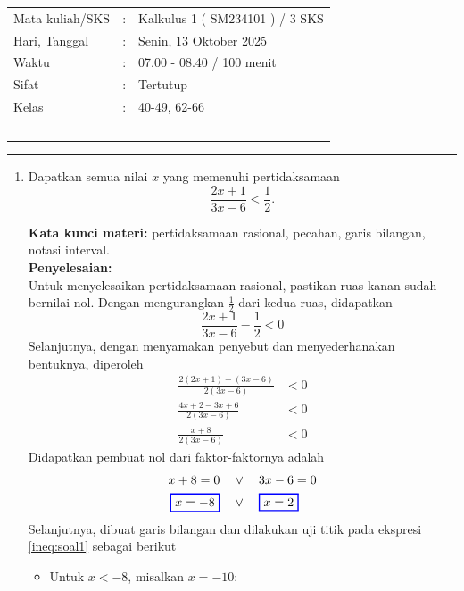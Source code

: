 \documentclass[10pt,openany,a4paper]{article}
\theoremstyle{definition}
\theoremstyle{definition}
\theoremstyle{plain}
\newenvironment{jawab}[2][tes]{%
\par\noindent\textbf{Kata kunci materi:} #1.\\
\textbf{Penyelesaian:} #2%
}{}
\begin{document}
    \begin{center}
	\begin{tabular}{lcl}
		Mata kuliah/SKS & : & Kalkulus 1 ( SM234101 ) / 3 SKS\\
		Hari, Tanggal & : & Senin, 13 Oktober 2025\\
		Waktu & : & 07.00 - 08.40 / 100 menit\\
		Sifat & : & Tertutup\\
		Kelas & : & 40-49, 62-66\\
  ~
	\end{tabular}

    \noindent\rule{\textwidth}{2.pt}
        \end{center}
    \begin{enumerate}
     \item Dapatkan semua nilai \(x\) yang memenuhi pertidaksamaan
    \[
        \dfrac{2x + 1}{3x - 6} < \dfrac{1}{2}.
    \]
\begin{jawab}[pertidaksamaan rasional, pecahan, garis bilangan, notasi interval]{~\\
        Untuk menyelesaikan pertidaksamaan rasional, pastikan ruas kanan sudah bernilai nol. Dengan mengurangkan \(\frac{1}{2}\) dari kedua ruas, didapatkan
        \[
        \frac{2x + 1}{3x - 6} - \frac{1}{2} < 0
        \]
        Selanjutnya, dengan menyamakan penyebut dan menyederhanakan bentuknya, diperoleh
        \begin{align}
            \frac{2(2x+1)-(3x-6)}{2(3x-6)} &< 0\nonumber\\
             \frac{4x + 2 - 3x + 6}{2(3x - 6)} &< 0\nonumber \\
             \frac{x + 8}{2(3x - 6)} &< 0 \label{ineq:soal1}
        \end{align}
        Didapatkan pembuat nol dari faktor-faktornya adalah
        \begin{align*}
            x+8 = 0 \quad &\vee\quad  3x - 6 = 0\\
            \colorlet{oldcolor}{.}
        \color{blue}
        \setlength{\fboxrule}{1pt} \boxed{\color{oldcolor}x=-8}\color{oldcolor}
         \quad &\vee\quad \colorlet{oldcolor}{.}
        \color{blue}
        \setlength{\fboxrule}{1pt} \boxed{\color{oldcolor}x=2}\color{oldcolor}
        \end{align*}
        Selanjutnya, dibuat garis bilangan dan dilakukan uji titik pada ekspresi \eqref{ineq:soal1} sebagai berikut
        \begin{itemize}
            \item Untuk \(x < -8\), misalkan \(x = -10\):

\end{itemize}}
\end{jawab}
\end{enumerate}
\end{document}
